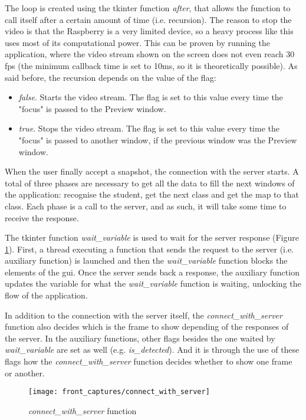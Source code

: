 The loop is created using the tkinter function \textit{after}, that allows the function to call itself after a certain amount of time (i.e. recursion). The reason to stop the video is that the Raspberry is a very limited device, so a heavy process like this uses most of its computational power. This can be proven by running the application, where the video stream shown on the screen does not even reach 30 \gls{fps} (the minimum callback time is set to 10ms, so it is theoretically possible). As said before, the recursion depends on the value of the flag:

\begin{itemize}
	\item \textit{false}. Starts the video stream. The flag is set to this value every time the "focus" is passed to the Preview window.
	\item \textit{true}. Stops the video stream. The flag is set to this value every time the "focus" is passed to another window, if the previous window was the Preview window.
\end{itemize}

When the user finally accept a snapshot, the connection with the server starts. A total of three phases are necessary to get all the data to fill the next windows of the application: recognise the student, get the next class and get the map to that class. Each phase is a call to the server, and as such, it will take some time to receive the response.

The tkinter function \textit{wait{\_}variable} is used to wait for the server response (Figure \ref{fig:connect_with_server}). First, a thread executing a function that sends the request to the server (i.e. auxiliary function) is launched and then the \textit{wait{\_}variable} function blocks the elements of the \gls{gui}. Once the server sends back a response, the auxiliary function updates the variable for what the \textit{wait{\_}variable} function is waiting, unlocking the flow of the application. 

In addition to the connection with the server itself, the \textit{connect{\_}with{\_}server} function also decides which is the frame to show depending of the responses of the server. In the auxiliary functions, other flags besides the one waited by \textit{wait{\_}variable} are set as well (e.g. \textit{is{\_}detected}). And it is through the use of these flags how the \textit{connect{\_}with{\_}server} function decides whether to show one frame or another. 

\begin{figure}[!ht]
	\centering
	\texttt{[image: front\_captures/connect\_with\_server]}
	\caption{\textit{connect{\_}with{\_}server} function}
	\label{fig:connect_with_server}
\end{figure}

